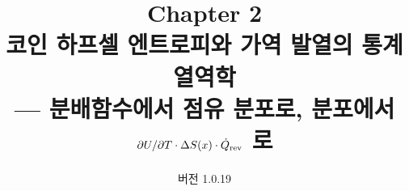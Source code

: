 

\title{\textbf{\LARGE Chapter 2}\\[0.35em]\Large 코인 하프셀 엔트로피와 가역 발열의 통계열역학\\[0.2em]\large — 분배함수에서 점유 분포로, 분포에서 $\partial U/\partial T\cdot\Delta S(x)\cdot\dot Q_{\mathrm{rev}}$ 로}
\author{}
\date{\normalsize 버전 1.0.19}


\maketitle
















